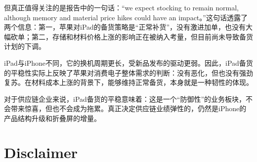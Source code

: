 \documentclass[11pt]{ctexart}
\begin{document}
但真正值得关注的是报告中的一句话：“we expect stocking to remain normal, although memory and material price hikes could have an impact。”这句话透露了两个信息：第一，苹果对iPad的备货策略是“正常补货”，没有激进加单，也没有大幅砍单；第二，存储和材料价格上涨的影响正在被纳入考量，但目前尚未导致备货计划的下调。

iPad与iPhone不同，它的换机周期更长，受新品发布的驱动更弱。因此，iPad备货的平稳性实际上反映了苹果对消费电子整体需求的判断：没有恶化，但也没有强劲复苏。在材料成本上涨的背景下，能够维持正常备货，本身就是一种韧性的体现。

对于供应链企业来说，iPad备货的平稳意味着：这是一个“防御性”的业务板块，不会带来惊喜，但也不会成为拖累。真正决定供应链业绩弹性的，仍然是iPhone的产品结构升级和折叠屏的增量。

\section{Disclaimer}
\end{document}

